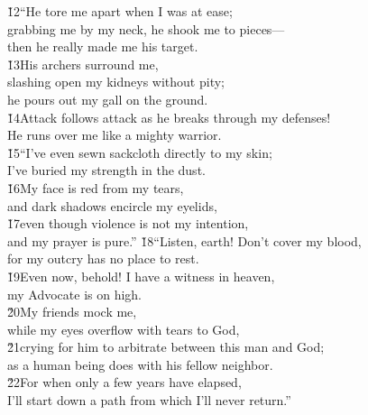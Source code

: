 \begin{poetry}
\poeml \v{12}``He tore me apart when I was at ease; \\
\poemll    grabbing me by my neck, he shook me to pieces--- \\
\poemlll       then he really made me his target. \\
\poeml \v{13}His archers surround me, \\
\poemll    slashing open my kidneys without pity; \\
\poemlll       he pours out my gall on the ground. \\
\poeml \v{14}Attack follows attack as he breaks through my defenses! \\
\poemll    He runs over me like a mighty warrior. \\
\poeml \v{15}``I've even sewn sackcloth directly to my skin; \\
\poemll    I've buried my strength in the dust. \\
\poeml \v{16}My face is red from my tears, \\
\poemll    and dark shadows encircle my eyelids, \\
\poeml \v{17}even though violence is not my intention, \\
\poemll    and my prayer is pure.''
\poeml \v{18}``Listen, earth! Don't cover my blood, \\
\poemll    for my outcry has no place to rest. \\
\poeml \v{19}Even now, behold! I have a witness in heaven, \\
\poemll    my Advocate is on high. \\
\poeml \v{20}My friends mock me, \\
\poemll    while my eyes overflow with tears to God, \\
\poeml \v{21}crying for him to arbitrate between this man and God; \\
\poemll    as a human being does with his fellow neighbor. \\
\poeml \v{22}For when only a few years have elapsed, \\
\poemll    I'll start down a path from which I'll never return.''
\end{poetry}

